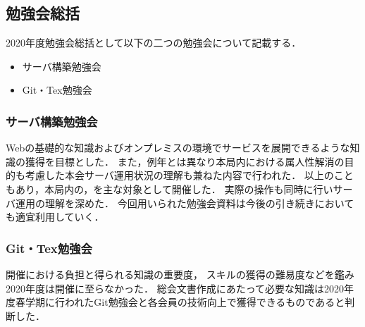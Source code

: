 \subsection*{勉強会総括}


2020年度勉強会総括として以下の二つの勉強会について記載する．
\begin{itemize}
    \item サーバ構築勉強会
    \item Git・Tex勉強会
\end{itemize}

\subsubsection*{サーバ構築勉強会}
Webの基礎的な知識およびオンプレミスの環境でサービスを展開できるような知識の獲得を目標とした．
また，例年とは異なり本局内における属人性解消の目的も考慮した本会サーバ運用状況の理解も兼ねた内容で行われた．
以上のこともあり，本局内の\firstGrade{}，\secondGrade{}を主な対象として開催した．
実際の操作も同時に行いサーバ運用の理解を深めた．
今回用いられた勉強会資料は今後の引き続きにおいても適宜利用していく．

\subsubsection*{Git・Tex勉強会}
開催における負担と得られる知識の重要度，
スキルの獲得の難易度などを鑑み2020年度は開催に至らなかった．
総会文書作成にあたって必要な知識は2020年度春学期に行われたGit勉強会と各会員の技術向上で獲得できるものであると判断した．
